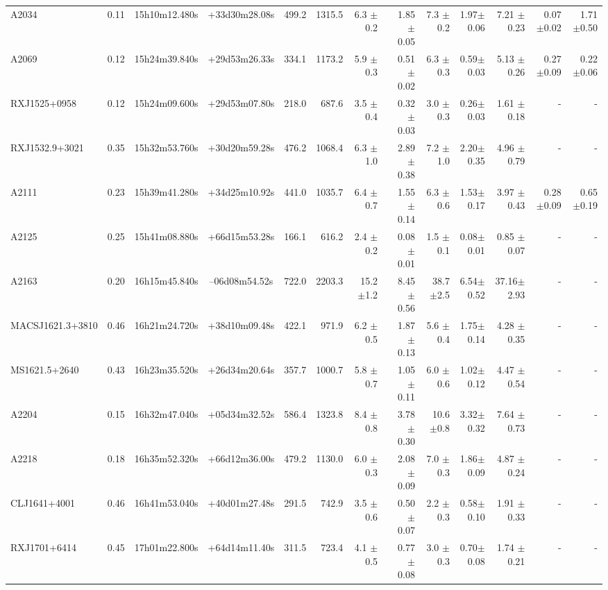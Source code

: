 \documentclass{aa}
\begin{document}
\begin{landscape}
\begin{longtable}{lcccrrrrrrrrr}
A2034   	 &0.11 & 15h10m12.480s &+33d30m28.08s  &  499.2   &  1315.5  &  6.3  $\pm$0.2 & 1.85 $\pm$ 0.05&7.3  $\pm$0.2  & 1.97$\pm$0.06& 7.21 $\pm$0.23& 0.07 $\pm$0.02 & 1.71 $\pm$0.50  \\
A2069  	 &0.12 & 15h24m39.840s &+29d53m26.33s  &  334.1   &  1173.2  &  5.9  $\pm$0.3 & 0.51 $\pm$ 0.02&6.3  $\pm$0.3  & 0.59$\pm$0.03& 5.13 $\pm$0.26& 0.27 $\pm$0.09 & 0.22 $\pm$0.06  \\
RXJ1525+0958	 &0.12 & 15h24m09.600s &+29d53m07.80s  &  218.0   &  687.6   &  3.5  $\pm$0.4 & 0.32 $\pm$ 0.03&3.0  $\pm$0.3  & 0.26$\pm$0.03& 1.61 $\pm$0.18& - & -   \\
RXJ1532.9+3021  &0.35 & 15h32m53.760s &+30d20m59.28s  &  476.2   &  1068.4  &  6.3  $\pm$1.0 & 2.89 $\pm$ 0.38&7.2  $\pm$1.0  & 2.20$\pm$0.35& 4.96 $\pm$0.79& - & -   \\
A2111  	 &0.23 & 15h39m41.280s &+34d25m10.92s  &  441.0   &  1035.7  &  6.4  $\pm$0.7 & 1.55 $\pm$ 0.14&6.3  $\pm$0.6  & 1.53$\pm$0.17& 3.97 $\pm$0.43& 0.28 $\pm$0.09 & 0.65 $\pm$0.19 \\
A2125  	 &0.25 & 15h41m08.880s &+66d15m53.28s  &  166.1   &  616.2   &  2.4  $\pm$0.2 & 0.08 $\pm$ 0.01&1.5  $\pm$0.1  & 0.08$\pm$0.01& 0.85 $\pm$0.07& - & -   \\
A2163  	 &0.20 & 16h15m45.840s &--06d08m54.52s  &  722.0   &  2203.3  &  15.2 $\pm$1.2 & 8.45 $\pm$ 0.56&38.7 $\pm$2.5  & 6.54$\pm$0.52& 37.16$\pm$2.93& - & -   \\
MACSJ1621.3+3810 &0.46 & 16h21m24.720s &+38d10m09.48s  &  422.1   &  971.9   &  6.2  $\pm$0.5 & 1.87 $\pm$ 0.13&5.6  $\pm$0.4  & 1.75$\pm$0.14& 4.28 $\pm$0.35& - & -   \\
MS1621.5+2640   &0.43 & 16h23m35.520s &+26d34m20.64s  &  357.7   &  1000.7  &  5.8  $\pm$0.7 & 1.05 $\pm$ 0.11&6.0  $\pm$0.6  & 1.02$\pm$0.12& 4.47 $\pm$0.54& - & -   \\
A2204   	 &0.15 & 16h32m47.040s &+05d34m32.52s  &  586.4   &  1323.8  &  8.4  $\pm$0.8 & 3.78 $\pm$ 0.30&10.6 $\pm$0.8  & 3.32$\pm$0.32& 7.64 $\pm$0.73& - & -   \\
A2218   	 &0.18 & 16h35m52.320s &+66d12m36.00s  &  479.2   &  1130.0  &  6.0  $\pm$0.3 & 2.08 $\pm$ 0.09&7.0  $\pm$0.3  & 1.86$\pm$0.09& 4.87 $\pm$0.24& - & -   \\
CLJ1641+4001	 &0.46 & 16h41m53.040s &+40d01m27.48s  &  291.5   &  742.9   &  3.5  $\pm$0.6 & 0.50 $\pm$ 0.07&2.2  $\pm$0.3  & 0.58$\pm$0.10& 1.91 $\pm$0.33& - & -   \\
RXJ1701+6414	 &0.45 & 17h01m22.800s &+64d14m11.40s  &  311.5   &  723.4   &  4.1  $\pm$0.5 & 0.77 $\pm$ 0.08&3.0  $\pm$0.3  & 0.70$\pm$0.08& 1.74 $\pm$0.21& - & -   \\

\end{longtable}
\end{landscape}
\end{document}
